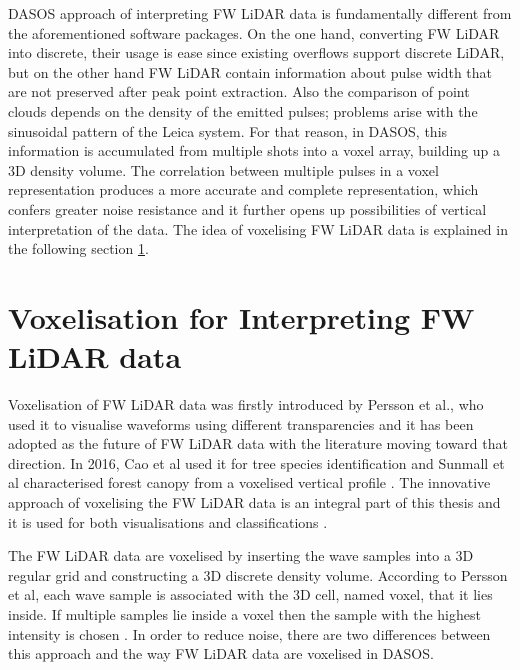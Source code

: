 \documentclass{subfiles}
\begin{document}
	\par DASOS approach of interpreting FW LiDAR data is fundamentally different from the aforementioned software packages. On the one hand, converting FW LiDAR into discrete, their usage is ease since existing overflows support discrete LiDAR, but on the other hand FW LiDAR contain information about pulse width that are not preserved after peak point extraction. Also the comparison of point clouds depends on the density of the emitted pulses; problems arise with the sinusoidal pattern of the Leica system. For that reason, in DASOS, this information is accumulated from multiple shots into a voxel array, building up a 3D density volume. The correlation between multiple pulses in a voxel representation produces a more accurate and complete representation, which confers greater noise resistance and it further opens up possibilities of vertical interpretation of the data. The idea of voxelising FW LiDAR data is explained in the following section \ref{Voxelisation}.  
	
		
	 \section{Voxelisation for Interpreting FW LiDAR data}\label{Voxelisation}
		
	\par Voxelisation of FW LiDAR data was firstly introduced by Persson et al., who used it to visualise waveforms using different transparencies \cite{Persson2005} and {\color {blue} it has been adopted as the future of FW LiDAR data with the literature moving toward that direction.} In 2016, Cao et al used it for tree species identification \cite{Cao2016} and Sunmall et al characterised forest canopy from a voxelised vertical profile \cite{Sumnall2016}. {\color{blue}The innovative approach of voxelising the FW LiDAR data }is an integral part of this thesis and it is used for both visualisations and classifications \cite{Miltiadou2014}\cite{Miltiadou2015}. 

		
		
	\par The FW LiDAR data are voxelised by inserting the wave samples into a 3D regular grid and constructing a 3D discrete density volume. According to Persson et al, each wave sample is associated with the 3D cell, named voxel, that it lies inside. If multiple samples lie inside a voxel then the sample with the highest intensity is chosen \cite{Persson2005}. In order to reduce noise, there are two differences between this approach and the way FW LiDAR data are voxelised in DASOS. 
		
\end{document}
